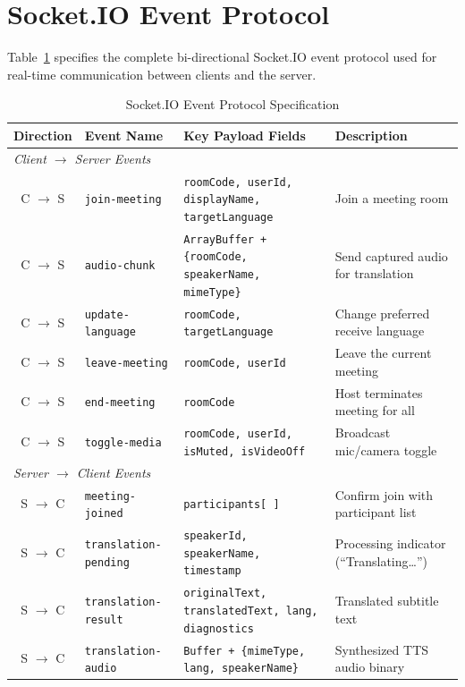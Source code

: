 \documentclass[conference]{IEEEtran}
\begin{document}
\section{Socket.IO Event Protocol}

Table~\ref{tab:socketevents} specifies the complete bi-directional Socket.IO event protocol used for real-time communication between clients and the server.

\begin{table}[htbp]
\centering
\caption{Socket.IO Event Protocol Specification}
\label{tab:socketevents}
\renewcommand{\arraystretch}{1.2}
{\small
\begin{tabular}{@{} c l l l @{}}
\toprule
\textbf{Direction} & \textbf{Event Name} & \textbf{Key Payload Fields} & \textbf{Description} \\
\midrule
\multicolumn{4}{l}{\textit{Client $\to$ Server Events}} \\
\midrule
C $\to$ S & \texttt{join-meeting}       & \texttt{roomCode, userId, displayName, targetLanguage} & Join a meeting room \\
C $\to$ S & \texttt{audio-chunk}        & \texttt{ArrayBuffer + \{roomCode, speakerName, mimeType\}} & Send captured audio for translation \\
C $\to$ S & \texttt{update-language}     & \texttt{roomCode, targetLanguage} & Change preferred receive language \\
C $\to$ S & \texttt{leave-meeting}       & \texttt{roomCode, userId} & Leave the current meeting \\
C $\to$ S & \texttt{end-meeting}         & \texttt{roomCode} & Host terminates meeting for all \\
C $\to$ S & \texttt{toggle-media}        & \texttt{roomCode, userId, isMuted, isVideoOff} & Broadcast mic/camera toggle \\
\midrule
\multicolumn{4}{l}{\textit{Server $\to$ Client Events}} \\
\midrule
S $\to$ C & \texttt{meeting-joined}      & \texttt{participants[ ]} & Confirm join with participant list \\
S $\to$ C & \texttt{translation-pending}  & \texttt{speakerId, speakerName, timestamp} & Processing indicator (``Translating\ldots'') \\
S $\to$ C & \texttt{translation-result}   & \texttt{originalText, translatedText, lang, diagnostics} & Translated subtitle text \\
S $\to$ C & \texttt{translation-audio}    & \texttt{Buffer + \{mimeType, lang, speakerName\}} & Synthesized TTS audio binary \\

\end{tabular}}
\end{table}
\end{document}

